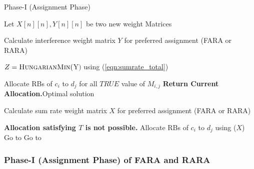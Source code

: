\documentclass{ieeeaccess}
\begin{document}
\begin{algorithm}

   \caption{Phase-I (Assignment Phase)}
   \label{algorithm1}
    \begin{algorithmic}[1]
    \footnotesize
        \State Let $X[n][n], Y[n][n]$ be two new weight Matrices \label{algorithm1:interferenceMatrix}
        
        \State Calculate interference weight matrix $Y$ for preferred assignment (FARA or RARA)
	
	\State $Z = \textproc{HungarianMin}($Y$)$  \Comment using (\ref{eqn:sumrate_total}) \label{algorithm1:hung_min}
	
	\;\label{algorithm1:checkreturn1}
		\State Allocate RBs of $c_i$ to $d_j$ for all $TRUE$ value of $M_{i,j}$
		\State \textbf{Return Current Allocation.}\Comment Optimal solution
	\Else{}
		
				
			\State Calculate sum rate weight matrix $X$ for preferred assignment (FARA or RARA)

		\label{algorithm1:checkispossible}
			\State \textbf{Allocation satisfying $T$ is not possible.}
		\Else
			\State Allocate RBs of $c_i$ to $d_j$ using ($X$) 
			\State Go to 
			\EndIf
			\State Go to 
			\EndIf
		\EndIf 
				
	\EndIf 
\EndProcedure
\vspace{-0.1cm}
\end{algorithmic}
\end{algorithm}


\subsubsection{Phase-I (Assignment Phase) of FARA and RARA}
\smallskip
 
\end{document}
